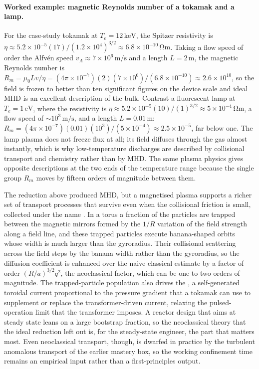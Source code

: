 \paragraph{Worked example: magnetic Reynolds number of a tokamak and a lamp.}
For the case-study tokamak at $T_{e} = 12\,\si{\kilo\electronvolt}$, the
Spitzer resistivity is $\eta \approx 5.2\times 10^{-5}(17)/(1.2\times
10^{4})^{3/2} \approx 6.8\times 10^{-10}\,\si{\ohm\meter}$. Taking a flow
speed of order the Alfv\'en speed $v_{A}\approx 7\times 10^{6}\,\si{\meter
\per\second}$ and a length $L = 2\,\si{\meter}$, the magnetic Reynolds
number is $R_{m} = \mu_{0}Lv/\eta = (4\pi\times 10^{-7})(2)(7\times 10^{6})/
(6.8\times 10^{-10}) \approx 2.6\times 10^{10}$, so the field is frozen to
better than ten significant figures on the device scale and ideal MHD is an
excellent description of the bulk. Contrast a fluorescent lamp at $T_{e} =
1\,\si{\electronvolt}$, where the resistivity is $\eta \approx 5.2\times
10^{-5}(10)/(1)^{3/2} \approx 5\times 10^{-4}\,\si{\ohm\meter}$, a flow speed
of $\sim 10^{3}\,\si{\meter\per\second}$, and a length $L = 0.01\,\si{\meter}$:
$R_{m} = (4\pi\times 10^{-7})(0.01)(10^{3})/(5\times 10^{-4}) \approx
2.5\times 10^{-5}$, far below one. The lamp plasma does not freeze flux at
all; its field diffuses through the gas almost instantly, which is why
low-temperature discharges are described by collisional transport and
chemistry rather than by MHD. The same plasma physics gives opposite
descriptions at the two ends of the temperature range because the single
group $R_{m}$ moves by fifteen orders of magnitude between them.

\begin{mastery}
The reduction above produced  MHD, but a magnetised plasma
supports a richer set of transport processes that survive even when the
collisional friction is small, collected under the name
. In a torus a fraction of the particles are
trapped between the magnetic mirrors formed by the $1/R$ variation of the
field strength along a field line, and these trapped particles execute
banana-shaped orbits whose width is much larger than the gyroradius. Their
collisional scattering across the field steps by the banana width rather than
the gyroradius, so the diffusion coefficient is enhanced over the naive
classical estimate by a factor of order $(R/a)^{3/2}q^{2}$, the
neoclassical factor, which can be one to two orders of magnitude. The
trapped-particle population also drives the , a
self-generated toroidal current proportional to the pressure gradient that a
tokamak can use to supplement or replace the transformer-driven current,
relaxing the pulsed-operation limit that the transformer imposes. A reactor
design that aims at steady state leans on a large bootstrap fraction, so the
neoclassical theory that the ideal reduction left out is, for the
steady-state engineer, the part that matters most. Even neoclassical
transport, though, is dwarfed in practice by the turbulent anomalous
transport of the earlier mastery box, so the working confinement time
remains an empirical input rather than a first-principles output.
\end{mastery}

